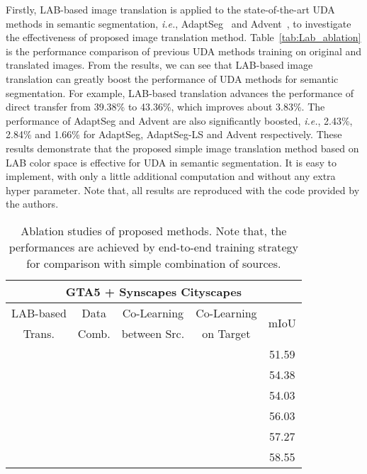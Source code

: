 \documentclass[final]{cvpr}
\def\ie{\textit{i.e.}}
\begin{document}
Firstly, LAB-based image translation is applied to the state-of-the-art UDA methods in semantic segmentation, \ie, AdaptSeg~\cite{tsai2018learning} and Advent~\cite{vu2019advent}, to investigate the effectiveness of proposed image translation method.
Table~\ref{tab:Lab_ablation} is the performance comparison of previous UDA methods training on original and translated images.
From the results, we can see that LAB-based image translation can greatly boost the performance of UDA methods for semantic segmentation. 
For example, LAB-based translation advances the performance of direct transfer from 39.38\% to 43.36\%, which improves about 3.83\%. The performance of AdaptSeg and Advent are also significantly boosted, \ie, 2.43\%, 2.84\% and 1.66\% for AdaptSeg, AdaptSeg-LS and Advent respectively. These results demonstrate that the proposed simple image translation method based on LAB color space is effective for UDA in semantic segmentation. It is easy to implement, with only a little additional computation and without any extra hyper parameter. Note that, all results are reproduced with the code provided by the authors.

\begin{table}[t]
	\centering
	\caption{Ablation studies of proposed methods. Note that, the performances are achieved by end-to-end training strategy for comparison with simple combination of sources.
	}
	\label{tab:combine_ablation}
	\vspace{1mm}
\setlength{\tabcolsep}{1mm}
\begin{tabular}{cccc|c}
		\hline
		\multicolumn{5}{c}{GTA5 + Synscapes  Cityscapes} \\ 
		\hline
LAB-based & Data & Co-Learning & Co-Learning &\multirow{2}{*}{mIoU} \\
		Trans. & Comb. & between Src. & on Target & \\
		\hline
		& \checkmark &  & & 51.59 \\
		 & \checkmark & & & 54.38 \\
		\hline
		 &  &  &   & 54.03\\
		 & &  & & 56.03 \\
		& &  &  &  57.27 \\
		 & &  &  & 58.55 \\
		\hline
	\end{tabular}
	\vspace{-10pt}
\end{table}
\end{document}
